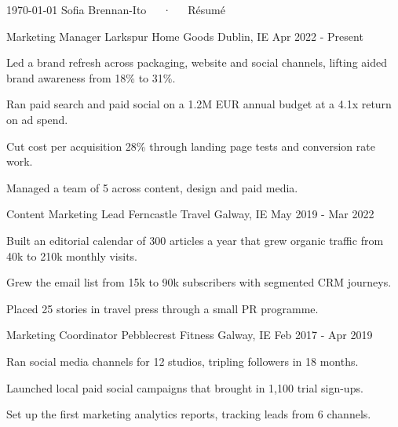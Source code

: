 \documentclass[11pt, a4paper]{awesome-cv}
\begin{document}
\makecvheader[C]

\makecvfooter
  {\today}
  {Sofia Brennan-Ito~~~·~~~Résumé}
  {\thepage}


\begin{cventries}

  \cventry
    {Marketing Manager} %
    {Larkspur Home Goods} %
    {Dublin, IE} %
    {Apr 2022 - Present} %
    {
      \begin{cvitems} %
        \item {Led a brand refresh across packaging, website and social channels, lifting aided brand awareness from 18\% to 31\%.} %
        \item {Ran paid search and paid social on a 1.2M EUR annual budget at a 4.1x return on ad spend.} %
        \item {Cut cost per acquisition 28\% through landing page tests and conversion rate work.} %
        \item {Managed a team of 5 across content, design and paid media.} %
      \end{cvitems}
    }

  \cventry
    {Content Marketing Lead} %
    {Ferncastle Travel} %
    {Galway, IE} %
    {May 2019 - Mar 2022} %
    {
      \begin{cvitems} %
        \item {Built an editorial calendar of 300 articles a year that grew organic traffic from 40k to 210k monthly visits.} %
        \item {Grew the email list from 15k to 90k subscribers with segmented CRM journeys.} %
        \item {Placed 25 stories in travel press through a small PR programme.} %
      \end{cvitems}
    }

  \cventry
    {Marketing Coordinator} %
    {Pebblecrest Fitness} %
    {Galway, IE} %
    {Feb 2017 - Apr 2019} %
    {
      \begin{cvitems} %
        \item {Ran social media channels for 12 studios, tripling followers in 18 months.} %
        \item {Launched local paid social campaigns that brought in 1,100 trial sign-ups.} %
        \item {Set up the first marketing analytics reports, tracking leads from 6 channels.} %
      \end{cvitems}
    }

\end{cventries}
\end{document}

